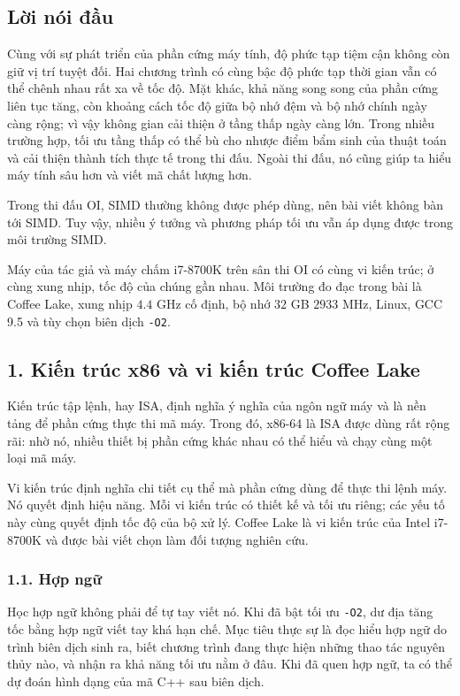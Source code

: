 \documentclass[11pt]{article}
\begin{document}
\subsection*{Lời nói đầu}

Cùng với sự phát triển của phần cứng máy tính, độ phức tạp tiệm cận không còn
giữ vị trí tuyệt đối. Hai chương trình có cùng bậc độ phức tạp thời gian vẫn có
thể chênh nhau rất xa về tốc độ. Mặt khác, khả năng song song của phần cứng
liên tục tăng, còn khoảng cách tốc độ giữa bộ nhớ đệm và bộ nhớ chính ngày
càng rộng; vì vậy không gian cải thiện ở tầng thấp ngày càng lớn. Trong nhiều
trường hợp, tối ưu tầng thấp có thể bù cho nhược điểm bẩm sinh của thuật toán
và cải thiện thành tích thực tế trong thi đấu. Ngoài thi đấu, nó cũng giúp ta
hiểu máy tính sâu hơn và viết mã chất lượng hơn.

Trong thi đấu OI, SIMD thường không được phép dùng, nên bài viết không bàn tới
SIMD. Tuy vậy, nhiều ý tưởng và phương pháp tối ưu vẫn áp dụng được trong môi
trường SIMD.

Máy của tác giả và máy chấm i7-8700K trên sân thi OI có cùng vi kiến trúc; ở
cùng xung nhịp, tốc độ của chúng gần nhau. Môi trường đo đạc trong bài là Coffee
Lake, xung nhịp \(4.4\) GHz cố định, bộ nhớ \(32\) GB \(2933\) MHz, Linux,
GCC 9.5 và tùy chọn biên dịch \texttt{-O2}.

\subsection*{1. Kiến trúc x86 và vi kiến trúc Coffee Lake}

Kiến trúc tập lệnh, hay ISA, định nghĩa ý nghĩa của ngôn ngữ máy và là nền tảng
để phần cứng thực thi mã máy. Trong đó, x86-64 là ISA được dùng rất rộng rãi:
nhờ nó, nhiều thiết bị phần cứng khác nhau có thể hiểu và chạy cùng một loại mã
máy.

Vi kiến trúc định nghĩa chi tiết cụ thể mà phần cứng dùng để thực thi lệnh máy.
Nó quyết định hiệu năng. Mỗi vi kiến trúc có thiết kế và tối ưu riêng; các yếu
tố này cùng quyết định tốc độ của bộ xử lý. Coffee Lake là vi kiến trúc của
Intel i7-8700K và được bài viết chọn làm đối tượng nghiên cứu.

\subsubsection*{1.1. Hợp ngữ}

Học hợp ngữ không phải để tự tay viết nó. Khi đã bật tối ưu \texttt{-O2}, dư địa
tăng tốc bằng hợp ngữ viết tay khá hạn chế. Mục tiêu thực sự là đọc hiểu hợp
ngữ do trình biên dịch sinh ra, biết chương trình đang thực hiện những thao tác
nguyên thủy nào, và nhận ra khả năng tối ưu nằm ở đâu. Khi đã quen hợp ngữ, ta
có thể dự đoán hình dạng của mã C++ sau biên dịch.
\end{document}
